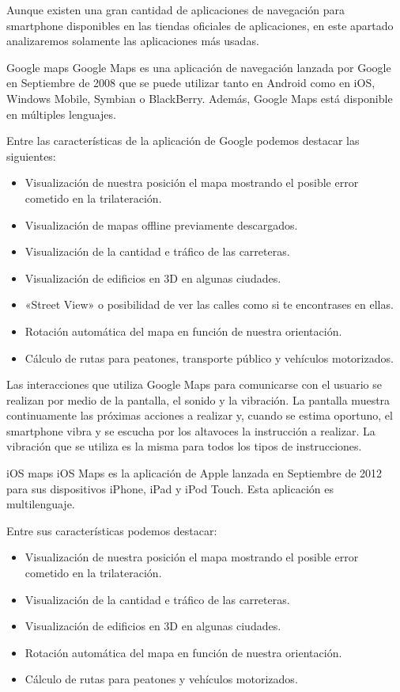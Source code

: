 Aunque existen una gran cantidad de aplicaciones de navegación para smartphone disponibles en las
tiendas oficiales de aplicaciones, en este apartado analizaremos solamente las aplicaciones más
usadas.

\begin{definitionlist}
  \item[Google maps] Google Maps es una aplicación de navegación lanzada por Google en Septiembre de
    2008 que se puede utilizar tanto en Android como en iOS, Windows Mobile, Symbian o
    BlackBerry. Además, Google Maps está disponible en múltiples lenguajes.

    Entre las características de la aplicación de Google podemos destacar las siguientes:

    \begin{itemize}
      \item Visualización de nuestra posición el mapa mostrando el posible error cometido en la
        trilateración.
      \item Visualización de mapas offline previamente descargados.
      \item Visualización de la cantidad e tráfico de las carreteras.
      \item Visualización de edificios en 3D en algunas ciudades.
      \item «Street View» o posibilidad de ver las calles como si te encontrases en ellas.
      \item Rotación automática del mapa en función de nuestra orientación.
      \item Cálculo de rutas para peatones, transporte público y vehículos motorizados.
    \end{itemize}

    Las interacciones que utiliza Google Maps para comunicarse con el usuario se realizan por medio
    de la pantalla, el sonido y la vibración. La pantalla muestra continuamente las próximas
    acciones a realizar y, cuando se estima oportuno, el smartphone vibra y se escucha por los
    altavoces la instrucción a realizar. La vibración que se utiliza es la misma para todos los
    tipos de instrucciones.

  \item[iOS maps] iOS Maps es la aplicación de Apple lanzada en Septiembre de 2012 para sus
    dispositivos iPhone, iPad y iPod Touch. Esta aplicación es multilenguaje.

    Entre sus características podemos destacar:

    \begin{itemize}
      \item Visualización de nuestra posición el mapa mostrando el posible error cometido en la
        trilateración.
      \item Visualización de la cantidad e tráfico de las carreteras.
      \item Visualización de edificios en 3D en algunas ciudades.
      \item Rotación automática del mapa en función de nuestra orientación.
      \item Cálculo de rutas para peatones y vehículos motorizados.
    \end{itemize}


\end{definitionlist}
